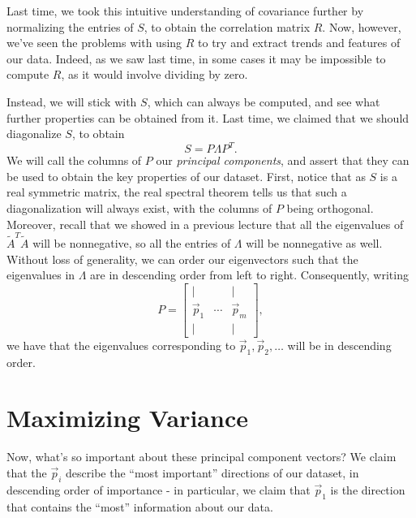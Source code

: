 \documentclass[letterpaper]{article}
\theoremstyle{remark}
\renewcommand{\tilde}[1]{\widetilde{#1}}
\newcommand{\mat}[1]{\ensuremath{\begin{bmatrix}#1\end{bmatrix}}}
\begin{document}
Last time, we took this intuitive understanding of covariance further by normalizing the entries of $S$, to obtain the correlation matrix $R$. Now, however, we've seen the problems with using $R$ to try and extract trends and features of our data. Indeed, as we saw last time, in some cases it may be impossible to compute $R$, as it would involve dividing by zero.

Instead, we will stick with $S$, which can always be computed, and see what further properties can be obtained from it. Last time, we claimed that we should diagonalize $S$, to obtain
\[
    S = P\Lambda P^T.
\]
We will call the columns of $P$ our \emph{principal components}, and assert that they can be used to obtain the key properties of our dataset. First, notice that as $S$ is a real symmetric matrix, the real spectral theorem tells us that such a diagonalization will always exist, with the columns of $P$ being orthogonal. Moreover, recall that we showed in a previous lecture that all the eigenvalues of $\tilde{A}^T\tilde{A}$ will be nonnegative, so all the entries of $\Lambda$ will be nonnegative as well. Without loss of generality, we can order our eigenvectors such that the eigenvalues in $\Lambda$ are in descending order from left to right. Consequently, writing
\[
    P = \mat{| & & | \\ \vec{p}_1 & \cdots & \vec{p}_m \\ | & & |},
\]
we have that the eigenvalues corresponding to $\vec{p}_1, \vec{p}_2, \ldots$ will be in descending order.

\section{Maximizing Variance}
Now, what's so important about these principal component vectors? We claim that the $\vec{p}_i$ describe the ``most important'' directions of our dataset, in descending order of importance - in particular, we claim that $\vec{p}_1$ is the direction that contains the ``most'' information about our data.
\end{document}
